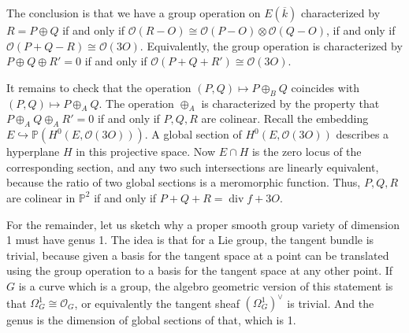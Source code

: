 The conclusion is that we have a group operation on \( E( \overline{k} ) \) characterized by \( R = P \oplus Q \) if and only if \( \mathcal{O} \left( R-O \right) \cong \mathcal{O}\left( P-O \right) \otimes \mathcal{O} \left( Q-O \right) \), if and only if \( \mathcal{O} \left( P + Q - R \right) \cong \mathcal{O}(3O) \).
Equivalently, the group operation is characterized by \( P \oplus Q \oplus R' = 0 \) if and only if \( \mathcal{O} \left( P + Q + R' \right) \cong \mathcal{O}(3O) \).

It remains to check that the operation \( \left( P,Q \right) \mapsto P \oplus_B Q \) coincides with \( \left( P,Q \right) \mapsto P \oplus_A Q \).
The operation \( \oplus_A \) is characterized by the property that \( P \oplus_A Q \oplus_A R' = 0 \) if and only if \( P,Q,R \) are colinear.
Recall the embedding \( E \hookrightarrow \mathbb{P} \left( H^0 \left( E, \mathcal{O}(3O) \right) \right) \).
A global section of \( H^0 \left( E, \mathcal{O}(3O) \right) \) describes a hyperplane \( H \) in this projective space.
Now \( E \cap H \) is the zero locus of the corresponding section, and any two such intersections are linearly equivalent, because the ratio of two global sections is a meromorphic function.
Thus, \( P,Q,R \) are colinear in \( \mathbb{P}^2 \) if and only if \( P+Q+R = \operatorname{div} f + 3O \).


For the remainder, let us sketch why a proper smooth group variety of dimension 1 must have genus 1.
The idea is that for a Lie group, the tangent bundle is trivial, because given a basis for the tangent space at a point can be translated using the group operation to a basis for the tangent space at any other point.
If \( G \) is a curve which is a group, the algebro geometric version of this statement is that \( \Omega^1_G \cong \mathcal{O}_G \), or equivalently the tangent sheaf \( \left( \Omega^1_G \right)^\vee \) is trivial.
And the genus is the dimension of global sections of that, which is 1.

